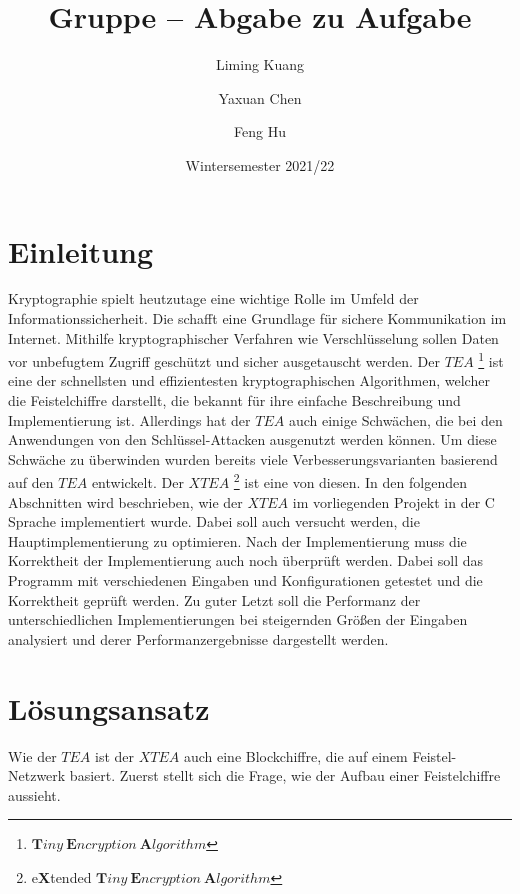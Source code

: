 \documentclass[course=erap]{aspdoc}
\author{Liming Kuang \and Yaxuan Chen \and Feng Hu}
\date{Wintersemester 2021/22}
\title{Gruppe \theGroup{} -- Abgabe zu Aufgabe \theNumber}
\begin{document}
\maketitle

\section{Einleitung}
Kryptographie spielt heutzutage eine wichtige Rolle im Umfeld der Informationssicherheit. Die schafft eine Grundlage für sichere Kommunikation im Internet. Mithilfe kryptographischer Verfahren wie Verschlüsselung sollen Daten vor unbefugtem Zugriff geschützt und sicher ausgetauscht werden. Der $TEA$ \footnote{$\textbf{T}iny\ \textbf{E}ncryption\ \textbf{A}lgorithm$} \cite{10.1007/3-540-60590-8_29} ist eine der schnellsten und effizientesten kryptographischen Algorithmen, welcher die Feistelchiffre darstellt, die bekannt für ihre einfache Beschreibung und Implementierung ist. Allerdings hat der $TEA$ auch einige Schwächen, die bei den Anwendungen von den Schlüssel-Attacken ausgenutzt werden können. Um diese Schwäche zu überwinden wurden bereits viele Verbesserungsvarianten basierend auf den $TEA$ entwickelt. Der $XTEA$ \footnote{e\textbf{X}tended $\textbf{T}iny\ \textbf{E}ncryption\ \textbf{A}lgorithm$} ist eine von diesen. In den folgenden Abschnitten wird beschrieben, wie der $XTEA$ im vorliegenden Projekt in der C Sprache implementiert wurde. Dabei soll auch versucht werden, die Hauptimplementierung zu optimieren. Nach der Implementierung muss die Korrektheit der Implementierung auch noch überprüft werden. Dabei soll das Programm mit verschiedenen Eingaben und Konfigurationen getestet und die Korrektheit geprüft werden. Zu guter Letzt soll die Performanz der unterschiedlichen Implementierungen bei steigernden Größen der Eingaben analysiert und derer Performanzergebnisse dargestellt werden.

\section{Lösungsansatz}
Wie der $TEA$ ist der $XTEA$ auch eine Blockchiffre, die auf einem Feistel-Netzwerk basiert. Zuerst stellt sich die Frage, wie der Aufbau einer Feistelchiffre aussieht.
\end{document}
